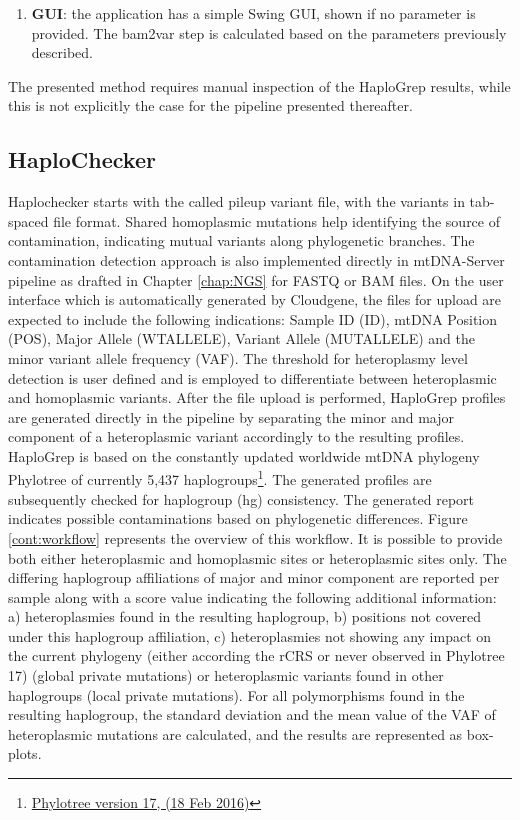 \begin{enumerate}
\begin{lstlisting}[language=bash]
java -jar greenVC-0.1.jar lofreq --in inputfile.vcf --out haplogrepinput.hsd 
\end{lstlisting}
\item \textbf{GUI}: the application has a simple Swing GUI, shown if no parameter is provided. The bam2var step is calculated based on the parameters previously described.
\end{enumerate}
The presented method requires manual inspection of the HaploGrep results, while this is not explicitly the case for the pipeline presented thereafter. 
\subsection{HaploChecker}\label{cont:haplochecker}
Haplochecker starts with the called pileup variant file, with the variants in tab-spaced file format. Shared homoplasmic mutations help identifying the source of contamination, indicating mutual variants along phylogenetic branches. The contamination detection approach is also implemented directly in mtDNA-Server pipeline as drafted in Chapter \ref{chap:NGS} for FASTQ or BAM files. On the user interface which is automatically generated by Cloudgene, the files for upload are expected to include the following indications: Sample ID (ID), mtDNA Position (POS), Major Allele (WTALLELE), Variant Allele (MUTALLELE) and the minor variant allele frequency (VAF). The threshold for heteroplasmy level detection is user defined and is employed to differentiate between heteroplasmic and homoplasmic variants. After the file upload is performed, HaploGrep  profiles are generated directly in the pipeline by separating the minor and major component of a heteroplasmic variant accordingly to the resulting profiles. HaploGrep is based on the constantly updated worldwide mtDNA phylogeny Phylotree of currently 5,437 haplogroups\footnote{\url{Phylotree version 17, (18 Feb 2016)}}. The generated profiles are subsequently checked for haplogroup (hg) consistency. The generated report indicates possible contaminations based on phylogenetic differences. Figure \ref{cont:workflow} represents the overview of this workflow. It is possible to provide both either heteroplasmic and homoplasmic sites or heteroplasmic sites only. The differing haplogroup affiliations of major and minor component are reported per sample along with a score value indicating the following additional information: a) heteroplasmies found in the resulting haplogroup, b) positions not covered under this haplogroup affiliation, c) heteroplasmies not showing any impact on the current phylogeny (either according the rCRS or never observed in Phylotree 17) (global private mutations) or heteroplasmic variants found in other haplogroups (local private mutations). For all polymorphisms found in the resulting haplogroup, the standard deviation and the mean value of the VAF of heteroplasmic mutations are calculated, and the results are represented as box-plots. 
